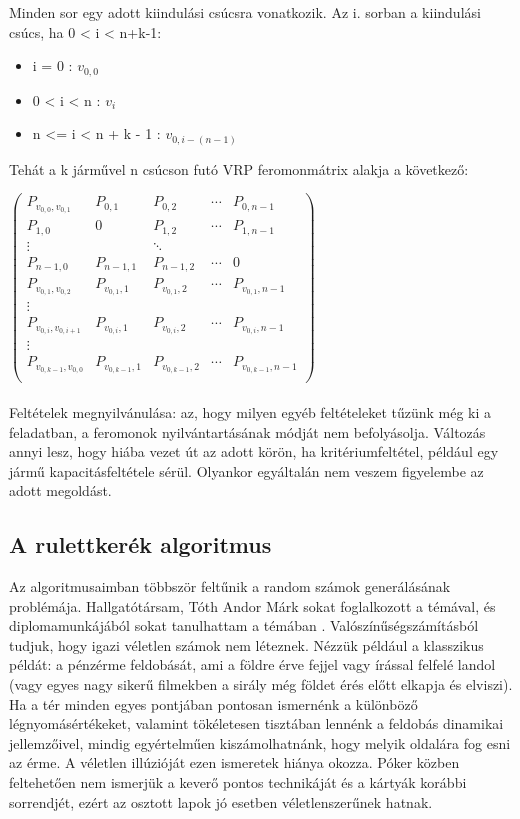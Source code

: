 Minden sor egy adott kiindulási csúcsra vonatkozik. Az i. sorban a kiindulási csúcs, ha 0 < i < n+k-1:
\begin{itemize}
	\item i = 0 :  \(v_{0,0}\)
	\item 0 < i < n : \(v_i\)
	\item n <= i < n + k - 1 :  \(v_{0,i-(n-1)}\)
\end{itemize}

Tehát a k járművel n csúcson futó VRP feromonmátrix alakja a következő:

$\begin{pmatrix}
	P_{v_{0,0},v_{0,1}} & P_{0,1} & P_{0,2} & \cdots & P_{0,n-1}\\ 
	P_{1,0} & 0 & P_{1,2} & \cdots & P_{1,n-1} \\
	\vdots & & \ddots \\
	P_{n-1,0} & P_{n-1,1} & P_{n-1,2} & \cdots & 0 \\
	P_{v_{0,1},v_{0,2}} & P_{v_{0,1},1} & P_{v_{0,1},2} & \cdots & P_{v_{0,1},n-1} \\
	\vdots & & \\
	P_{v_{0,i},v_{0,i+1}} & P_{v_{0,i},1} & P_{v_{0,i},2} & \cdots & P_{v_{0,i},n-1} \\
	\vdots & & \\
	P_{v_{0,k-1},v_{0,0}} & P_{v_{0,k-1},1} & P_{v_{0,k-1},2} & \cdots & P_{v_{0,k-1},n-1} \\
\end{pmatrix}$

\paragraph{}
Feltételek megnyilvánulása: az, hogy milyen egyéb feltételeket tűzünk még ki a feladatban, a feromonok nyilvántartásának módját nem befolyásolja. Változás annyi lesz, hogy hiába vezet út az adott körön, ha kritériumfeltétel, például egy jármű kapacitásfeltétele sérül. Olyankor egyáltalán nem veszem figyelembe az adott megoldást.



\subsection{A rulettkerék algoritmus }
Az algoritmusaimban többször feltűnik a random számok generálásának problémája. Hallgatótársam, Tóth Andor Márk sokat foglalkozott a témával, és diplomamunkájából sokat tanulhattam a témában \cite{alg_optim}. Valószínűségszámításból tudjuk, hogy igazi véletlen számok nem léteznek. Nézzük például a klasszikus példát: a pénzérme feldobását, ami a földre érve fejjel vagy írással felfelé landol (vagy egyes nagy sikerű filmekben a sirály még földet érés előtt elkapja és elviszi). Ha a tér minden egyes pontjában pontosan ismernénk a különböző légnyomásértékeket, valamint tökéletesen tisztában lennénk a feldobás dinamikai jellemzőivel, mindig egyértelműen kiszámolhatnánk, hogy melyik oldalára fog esni az érme. A véletlen illúzióját ezen ismeretek hiánya okozza. Póker közben feltehetően nem ismerjük a keverő pontos technikáját és a kártyák korábbi sorrendjét, ezért az osztott lapok jó esetben véletlenszerűnek hatnak. 

